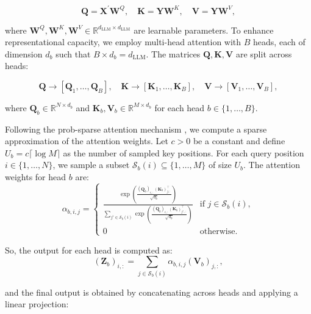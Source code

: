 \begin{equation}
    \mathbf{Q} = \mathbf{X}^\prime \mathbf{W}^Q, \quad \mathbf{K} = \mathbf{Y} \mathbf{W}^K, \quad \mathbf{V} = \mathbf{Y} \mathbf{W}^V,
\end{equation}

where $\mathbf{W}^Q, \mathbf{W}^K, \mathbf{W}^V \in \mathbb{R}^{d_{\text{LLM}} \times d_{\text{LLM}}}$ are learnable parameters. To enhance representational capacity, we employ multi-head attention with $B$ heads, each of dimension $d_b$ such that $B \times d_b = d_{\text{LLM}}$. The matrices $\mathbf{Q}, \mathbf{K}, \mathbf{V}$ are split across heads:

\begin{equation}
    \mathbf{Q} \to [\mathbf{Q}_1,\ldots,\mathbf{Q}_B], \quad \mathbf{K} \to [\mathbf{K}_1,\ldots,\mathbf{K}_B], \quad \mathbf{V} \to [\mathbf{V}_1,\ldots,\mathbf{V}_B],
\end{equation}

where $\mathbf{Q}_b \in \mathbb{R}^{N \times d_b}$ and $\mathbf{K}_b, \mathbf{V}_b \in \mathbb{R}^{M \times d_b}$ for each head $b \in \{1,\ldots,B\}$.

Following the prob-sparse attention mechanism \citep{informer_2021}, we compute a sparse approximation of the attention weights. Let $c>0$ be a constant and define $U_b = c\lceil \log M \rceil$ as the number of sampled key positions. For each query position $i \in \{1,\ldots,N\}$, we sample a subset $\mathcal{S}_b(i) \subseteq \{1,\ldots,M\}$ of size $U_b$. The attention weights for head $b$ are:
\begin{equation}
    \alpha_{b,i,j} = 
    \begin{cases}
        \frac{\exp\left(\frac{(\mathbf{Q}_b)_{i,:}(\mathbf{K}_b)_{j,:}^\top}{\sqrt{d_b}}\right)}{\sum_{j' \in \mathcal{S}_b(i)} \exp\left(\frac{(\mathbf{Q}_b)_{i,:}(\mathbf{K}_b)_{j',:}^\top}{\sqrt{d_b}}\right)} & \text{if } j \in \mathcal{S}_b(i), \\
        0 & \text{otherwise}.
    \end{cases}
\end{equation}

So, the output for each head is computed as:
\begin{equation}
    (\mathbf{Z}_b)_{i,:} = \sum_{j \in \mathcal{S}_b(i)} \alpha_{b,i,j} (\mathbf{V}_b)_{j,:},
\end{equation}

and the final output is obtained by concatenating across heads and applying a linear projection:

